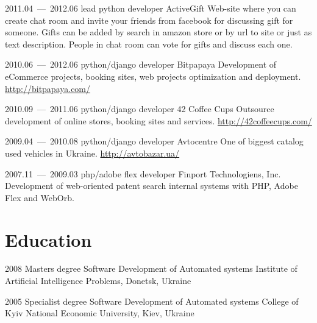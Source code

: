 \documentclass[11pt,a4paper,oneside]{moderncv}
\begin{document}
        \cventry
            {2011.04~--–~2012.06}
            {lead python developer}
            {ActiveGift}
            {}{}
            {
              Web-site where you can create chat room and invite your friends from facebook for discussing gift for someone. Gifts can be added by search in amazon store or by url to site or just as text description. People in chat room can vote for gifts and discuss each one.
            }

        \cventry
            {2010.06~--–~2012.06}
            {python/django developer}
            {Bitpapaya}
            {}{}
            {
                Development of eCommerce projects, booking sites, web projects optimization and deployment. \url{http://bitpapaya.com/}
            }

        \cventry
            {2010.09~--–~2011.06}
            {python/django developer}
            {42 Coffee Cups}
            {}{}
            {
                Outsource development of online stores, booking sites and services. \url{http://42coffeecups.com/}
            }

        \cventry
            {2009.04~--–~2010.08}
            {python/django developer}
            {Avtocentre}
            {}{}
            {
                One of biggest catalog used vehicles in Ukraine. \url{http://avtobazar.ua/}
            }

        \cventry
            {2007.11~--–~2009.03}
            {php/adobe flex developer}
            {Finport Technologiens, Inc.}
            {}{}
            {
                Development of web-oriented patent search internal systems with PHP, Adobe Flex and WebOrb.
            }

    \section{Education}
        \cventry
            {2008}
            {Masters degree}
            {Software Development of Automated systems}
            {Institute of Artificial Intelligence Problems, Donetsk, Ukraine}
            {}{}

        \cventry
            {2005}
            {Specialist degree}
            {Software Development of Automated systems}
            {College of Kyiv National Economic University, Kiev, Ukraine}
            {}{}
\end{document}
